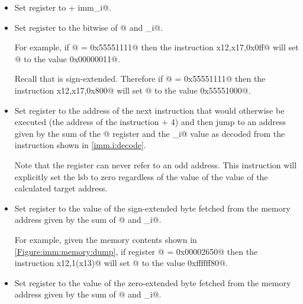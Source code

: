 \begin{itemize}
\item{}
\label{insn:addi}

Set register \verb@rd@ to  + imm_i@.

\item{}
\label{insn:andi}

Set register \verb@rd@ to the bitwise \verb@and@ of @ and \verb@imm_i@.

For example, if @ = \verb@0x55551111@ then the instruction 
\verb@andi x12,x17,0x0ff@ will set @ to the value \verb@0x00000011@.

Recall that \verb@imm@ is sign-extended.  
Therefore if @ = \verb@0x55551111@ then the instruction 
\verb@andi x12,x17,0x800@ will set @ to the value \verb@0x55551000@.

\item{}
\label{insn:jalr}

Set register \verb@rd@ to the address of the next instruction that would 
otherwise be executed (the address of the \verb@jalr@ instruction + 4) and then 
jump to an address given by the sum of the @ register and the 
\verb@imm_i@ value as decoded from the instruction shown in \autoref{imm.i:decode}.

Note that the \verb@pc@ register can never refer to an odd address.  
This instruction will explicitly set the \acrshort{lsb} to zero regardless
of the value of the value of the calculated target address.

\item{}
\label{insn:lb}

Set register \verb@rd@ to the value of the sign-extended byte fetched from 
the memory address given by the sum of @ and \verb@imm_i@.

For example, given the memory contents shown in \autoref{Figure:imm:memory:dump},
if register @ = \verb@0x00002650@ then the instruction
\verb@lb x12,1(x13)@ will set @ to the value \verb@0xffffff80@.

\item{}
\label{insn:lbu}

Set register \verb@rd@ to the value of the zero-extended byte fetched from 
the memory address given by the sum of @ and \verb@imm_i@.


\end{itemize}
